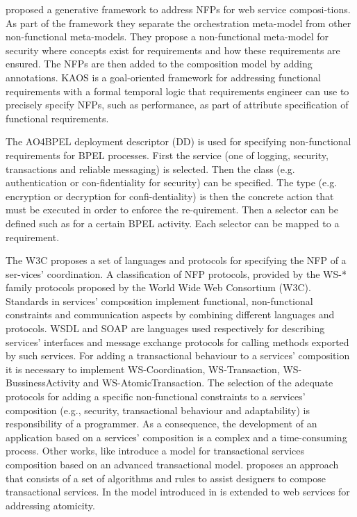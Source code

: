 \cite{ChLa09} proposed a generative framework to address NFPs for web service composi-tions. As part of the framework they separate the orchestration meta-model from other non-functional meta-models. They propose a non-functional meta-model for security where concepts exist for requirements and how these requirements are ensured. The NFPs are then added to the composition model by adding annotations.
KAOS \cite{DaLF93,Lams01} is a goal-oriented framework for addressing functional requirements with a formal temporal logic that requirements engineer can use to precisely specify NFPs, such as performance, as part of attribute specification of functional requirements. 

The AO4BPEL \cite{CSHM06} deployment descriptor (DD) is used for specifying non-functional requirements for BPEL processes. First the service (one of logging, security, transactions and reliable messaging) is selected. Then the class (e.g. authentication or con-fidentiality for security) can be specified. The type (e.g. encryption or decryption for confi-dentiality) is then the concrete action that must be executed in order to enforce the re-quirement. Then a selector can be defined such as for a certain BPEL activity. Each selector can be mapped to a requirement. 

The W3C proposes a set of languages and protocols for specifying the NFP of a ser-vices’ coordination. A classification of NFP protocols, provided by the WS-* family protocols proposed by the World Wide Web Consortium (W3C). 
%
%
 Standards in services' composition implement functional, non-functional constraints and communication aspects by combining different languages and protocols. WSDL and SOAP are languages used respectively for describing services' interfaces and message exchange protocols for calling methods exported by such services. For adding a transactional behaviour to a services' composition it is necessary to implement WS-Coordination, WS-Transaction, WS-BussinessActivity and WS-AtomicTransaction. The selection of the adequate protocols for adding a specific non-functional constraints to a services' composition (e.g., security, transactional behaviour and adaptability) is responsibility of a programmer. As a consequence, the development of an application based on a services' composition is a complex and a time-consuming process.
 Other works, like \cite{Fauvet05} introduce a model for transactional services composition based on an advanced transactional model.\cite{BhiriGP05} proposes an approach that consists of a set of algorithms and rules to assist designers to compose transactional services. In \cite{Vidyasankar:2004} the model introduced in \cite{SchuldtABS02} is extended to web services for addressing atomicity.

